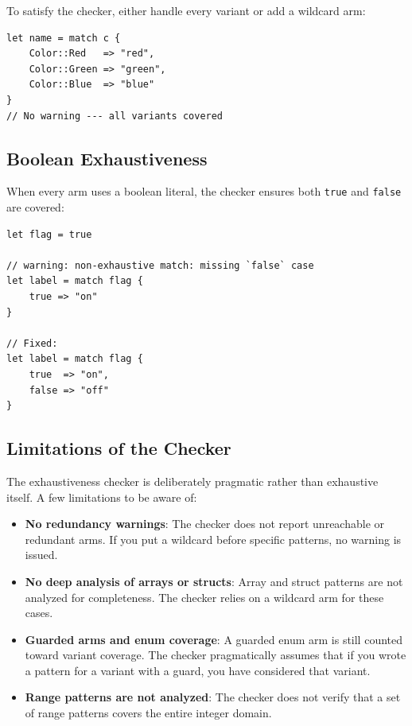 To satisfy the checker, either handle every variant or add a wildcard arm:

\begin{lstlisting}[language=Lattice, caption={Making an enum match exhaustive}]
let name = match c {
    Color::Red   => "red",
    Color::Green => "green",
    Color::Blue  => "blue"
}
// No warning --- all variants covered
\end{lstlisting}

\subsection{Boolean Exhaustiveness}\label{sec:bool-exhaustiveness}

When every arm uses a boolean literal, the checker ensures both \lstinline|true| and \lstinline|false| are covered:

\begin{lstlisting}[language=Lattice, caption={Boolean exhaustiveness}]
let flag = true

// warning: non-exhaustive match: missing `false` case
let label = match flag {
    true => "on"
}

// Fixed:
let label = match flag {
    true  => "on",
    false => "off"
}
\end{lstlisting}

\subsection{Limitations of the Checker}\label{sec:checker-limitations}

The exhaustiveness checker is deliberately pragmatic rather than exhaustive itself. A few limitations to be aware of:

\begin{itemize}
  \item \textbf{No redundancy warnings}: The checker does not report unreachable or redundant arms. If you put a wildcard before specific patterns, no warning is issued.
  \item \textbf{No deep analysis of arrays or structs}: Array and struct patterns are not analyzed for completeness. The checker relies on a wildcard arm for these cases.
  \item \textbf{Guarded arms and enum coverage}: A guarded enum arm is still counted toward variant coverage. The checker pragmatically assumes that if you wrote a pattern for a variant with a guard, you have considered that variant.
  \item \textbf{Range patterns are not analyzed}: The checker does not verify that a set of range patterns covers the entire integer domain.
\end{itemize}

